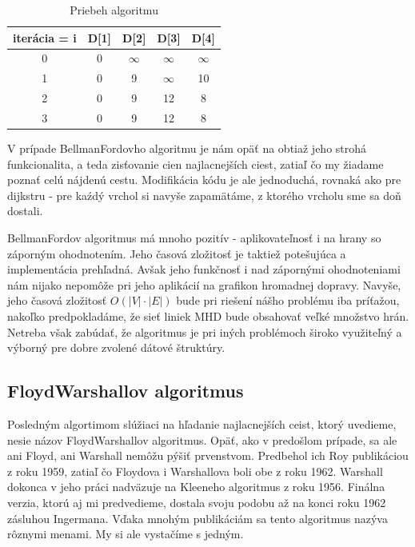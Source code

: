 \begin{table}[H]
  \begin{center}
    \caption{Priebeh algoritmu}
    \label{priebeh_bellman-ford}
    \begin{tabular}{ | c | c | c | c | c | }
      \hline
      iterácia = i & D[1] & D[2] & D[3] & D[4] \\
      \hline
      0 & 0 & $\infty$ & $\infty$ & $\infty$ \\
      1 & 0 & 9 & $\infty$ & 10 \\
      2 & 0 & 9 & 12 & 8 \\
      3 & 0 & 9 & 12 & 8 \\
      \hline
    \end{tabular}
  \end{center}
\end{table}

V prípade Bellman\textendash Fordovho algoritmu je nám opäť na obtiaž jeho strohá funkcionalita, a teda zisťovanie cien najlacnejších ciest, zatiaľ čo my žiadame poznať celú nájdenú cestu. Modifikácia kódu je ale jednoduchá, rovnaká ako pre dijkstru - pre kaźdý vrchol si navyše zapamätáme, z ktorého vrcholu sme sa doň dostali.\newline

Bellman\textendash Fordov algoritmus má mnoho pozitív - aplikovateľnosť i na hrany so záporným ohodnotením. Jeho časová zložitosť je taktiež potešujúca a implementácia prehľadná. Avšak jeho funkčnosť i nad zápornými ohodnoteniami nám nijako nepomôže pri jeho aplikácií na grafikon hromadnej dopravy. Navyše, jeho časová zložitosť $O(|V|\cdot |E|)$ bude pri riešení nášho problému iba príťažou, nakoľko predpokladáme, že sieť liniek MHD bude obsahovať veľké množstvo hrán. Netreba však zabúdať, že algoritmus je pri iných problémoch široko využiteľný a výborný pre dobre zvolené dátové štruktúry.\newline


\subsection{Floyd\textendash Warshallov algoritmus}

Posledným algortimom slúžiaci na hľadanie najlacnejších ceist, ktorý uvedieme, nesie názov Floyd\textendash Warshallov algoritmus. Opäť, ako v predošlom prípade, sa ale ani Floyd, ani Warshall nemôžu pýšiť prvenstvom. Predbehol ich Roy publikáciou z roku 1959, zatiaľ čo Floydova i Warshallova boli obe z roku 1962. Warshall dokonca v jeho práci nadväzuje na Kleeneho algoritmus z roku 1956. Finálna verzia, ktorú aj mi predvedieme, dostala svoju podobu až na konci roku 1962 zásluhou Ingermana. Vďaka mnohým publikáciám sa tento algoritmus nazýva rôznymi menami. My si ale vystačíme s jedným.

